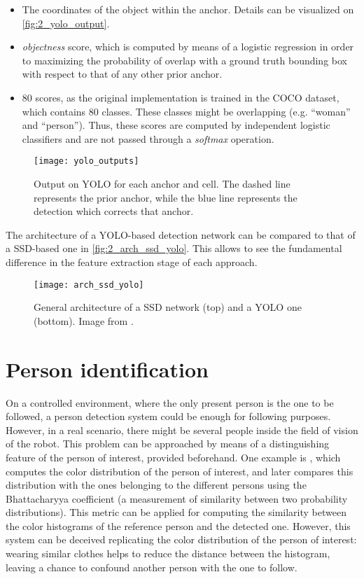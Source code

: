 \begin{itemize}
	\item The coordinates of the object within the anchor. Details can be visualized on \autoref{fig:2_yolo_output}.
	
	\item \textit{objectness} score, which is computed by means of a logistic regression in order to maximizing the probability of overlap with a ground truth bounding box with respect to that of any other prior anchor.
	
	\item 80 scores, as the original implementation is trained in the COCO dataset, which contains 80 classes. These classes might be overlapping (e.g. ``woman'' and ``person''). Thus, these scores are computed by independent logistic classifiers and are not passed through a \textit{softmax} operation.
\end{itemize}


\begin{figure}[h]
	\centering
	\texttt{[image: yolo\_outputs]}
	\caption{Output on YOLO for each anchor and cell. The dashed line represents the prior anchor, while the blue line represents the detection which corrects that anchor.}
	\label{fig:2_yolo_output}
\end{figure}


The architecture of a YOLO-based detection network can be compared to that of a SSD-based one in \autoref{fig:2_arch_ssd_yolo}. This allows to see the fundamental difference in the feature extraction stage of each approach.

\begin{figure}[h]
	\centering
	\texttt{[image: arch\_ssd\_yolo]}
	\caption{General architecture of a SSD network (top) and a YOLO one (bottom). Image from \cite{ssd}.}
	\label{fig:2_arch_ssd_yolo}
\end{figure}

\newpage
\section{Person identification}
\label{sec:2_ident}
On a controlled environment, where the only present person is the one to be followed, a person detection system could be enough for following purposes. However, in a real scenario, there might be several people inside the field of vision of the robot. This problem can be approached by means of a distinguishing feature of the person of interest, provided beforehand. One example is \cite{color_id}, which computes the color distribution of the person of interest, and later compares this distribution with the ones belonging to the different persons using the Bhattacharyya coefficient \cite{bhattacharyya} (a measurement of similarity between two probability distributions). This metric can be applied for computing the similarity between the color histograms of the reference person and the detected one. However, this system can be deceived replicating the color distribution of the person of interest: wearing similar clothes helps to reduce the distance between the histogram, leaving a chance to confound another person with the one to follow.\\

